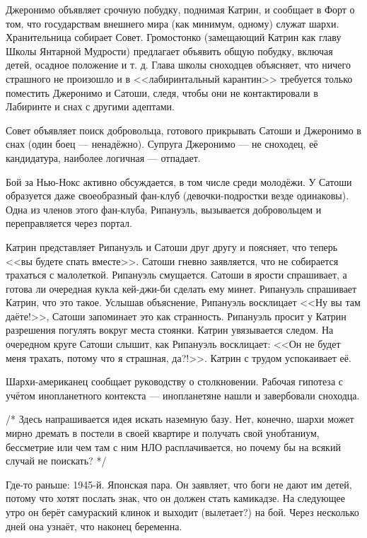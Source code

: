 Джеронимо объявляет срочную побудку, поднимая Катрин, и сообщает в Форт о том, что государствам внешнего мира
(как минимум, одному) служат шархи.
Хранительница собирает Совет. Громостонко (замещающий Катрин как главу Школы Янтарной Мудрости)
предлагает объявить общую побудку, включая детей, осадное положение и т. д.
Глава школы сноходцев объясняет, что ничего страшного не произошло и в <<лабиринтальный карантин>>
требуется только поместить Джеронимо и Сатоши, следя, чтобы они не контактировали в Лабиринте и снах с другими адептами.

Совет объявляет поиск добровольца, готового прикрывать Сатоши и Джеронимо в снах (один боец --- ненадёжно).
Супруга Джеронимо --- не сноходец, её кандидатура, наиболее логичная --- отпадает.


Бой за Нью-Нокс активно обсуждается, в том числе среди молодёжи.
У Сатоши образуется даже своеобразный фан-клуб (девочки-подростки везде одинаковы).
Одна из членов этого фан-клуба, Рипануэль, вызывается добровольцем и переправляется через портал.

Катрин представляет Рипануэль и Сатоши друг другу и поясняет, что теперь <<вы будете спать вместе>>.
Сатоши гневно заявляется, что не собирается трахаться с малолеткой. Рипануэль смущается.
Сатоши в ярости спрашивает, а готова ли очередная кукла кей-джи-би сделать ему минет.
Рипануэль спрашивает Катрин, что это такое. Услышав объяснение, Рипануэль восклицает <<Ну вы там даёте!>>,
Сатоши запоминает это как странность.
Рипануэль просит у Катрин разрешения погулять вокруг места стоянки. Катрин увязывается следом.
На очередном круге Сатоши слышит, как Рипануэль восклицает: <<Он не будет меня трахать, потому что я страшная, да?!>>.
Катрин с трудом успокаивает её.



Шархи-американец сообщает руководству о столкновении.
Рабочая гипотеза с учётом инопланетного контекста --- инопланетяне нашли и завербовали сноходца.


/*
Здесь напрашивается идея искать наземную базу.
Нет, конечно, шархи может мирно дремать в постели в своей квартире и получать свой унобтаниум,
бессметрие или чем там с ним НЛО расплачивается, но почему бы на всякий случай не поискать?
*/


Где-то раньше: 1945-й. Японская пара.
Он заявляет, что боги не дают им детей, потому что хотят послать знак, что он должен стать камикадзе.
На следующее утро он берёт самураский клинок и выходит (вылетает?) на бой.
Через несколько дней она узнаёт, что наконец беременна.



